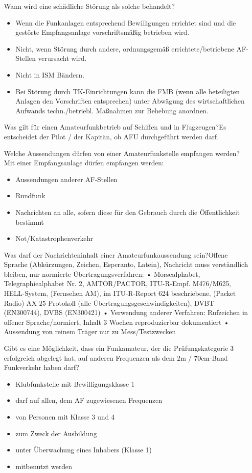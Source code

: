 \documentclass[avery5371,grid,frame,a4paper]{flashcards}
\newcommand{\card}[3]{
  \begin{flashcard}[{\chap} -- #1]{#2}#3\end{flashcard}
}
\begin{document}
\card{47}{Wann wird eine schädliche Störung als solche behandelt?}{\small{\begin{itemize}\itemsep0pt \item Wenn die Funkanlagen entsprechend Bewilligungen errichtet sind und die gestörte Empfangsanlage vorschriftsmäßig betrieben wird. \item Nicht, wenn Störung durch andere, ordnungsgemäß errichtete/betriebene AF-Stellen verursacht wird. \item Nicht in ISM Bändern. \item Bei Störung durch TK-Einrichtungen kann die FMB (wenn alle beteiligten Anlagen den Vorschriften entsprechen) unter Abwägung des wirtschaftlichen Aufwands techn./betriebl. Maßnahmen zur Behebung anordnen.\end{itemize}}}

\card{48}{Was gilt für einen Amateurfunkbetrieb auf Schiffen und in Flugzeugen?}{Es entscheidet der Pilot / der Kapitän, ob AFU durchgeführt werden darf.}

\card{49}{Welche Aussendungen dürfen von einer Amateurfunkstelle empfangen werden?}{Mit einer Empfangsanlage dürfen empfangen werden: \begin{itemize}\itemsep1pt \item Aussendungen anderer AF-Stellen \item Rundfunk \item Nachrichten an alle, sofern diese für den
Gebrauch durch die Öffentlichkeit bestimmt \item Not/Katastrophenverkehr\end{itemize}}

\card{50}{Was darf der Nachrichteninhalt einer Amateurfunkaussendung sein?}{\small{Offene Sprache (Abkürzungen, Zeichen, Esperanto, Latein), Nachricht muss verständlich bleiben, nur normierte Übertragungsverfahren:
•  Morsealphabet, Telegraphiealphabet Nr. 2, AMTOR/PACTOR, ITU-R-Empf. M476/M625, HELL-System, (Fernsehen AM), im ITU-R-Report 624 beschriebene, (Packet Radio) AX-25
Protokoll (alle Übertragungsgeschwindigkeiten), DVBT (EN300744), DVBS (EN300421)
•  Verwendung anderer Verfahren: Rufzeichen in offener Sprache/normiert, Inhalt 3 Wochen reproduzierbar dokumentiert
•  Aussendung von reinem Träger nur zu Mess/Testzwecken}}

\card{51}{Gibt es eine Möglichkeit, dass ein Funkamateur, der die Prüfungskategorie 3 erfolgreich abgelegt hat, auf anderen Frequenzen als dem 2m / 70cm-Band Funkverkehr haben darf?}{\begin{itemize}\itemsep1pt \item Klubfunkstelle mit Bewilligungsklasse 1 \item darf auf allen, dem AF zugewiesenen Frequenzen \item von Personen mit Klasse 3 und 4 \item zum Zweck der Ausbildung \item unter Überwachung eines Inhabers (Klasse 1) \item mitbenutzt werden\end{itemize}}
\end{document}
